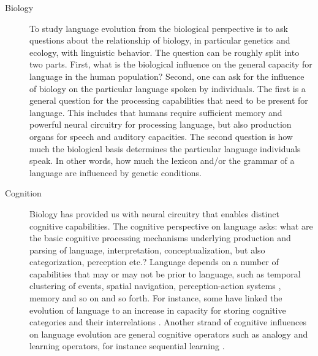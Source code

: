 \begin{description}
\item[Biology] To study language evolution from the biological
perspective is to ask questions about the relationship of biology,
in particular genetics and ecology, with linguistic behavior.
The question can be roughly split into two parts.
First, what is the biological influence on the general capacity for language
in the human population? Second, one can ask for the influence of biology on 
the particular language spoken by individuals. The first is a general question for 
the processing capabilities that need to be present for language.
This includes that humans require sufficient memory and powerful neural 
circuitry for processing language, but also production organs for speech 
and auditory capacities. The second question is how much the biological basis 
determines the particular language individuals speak. 
In other words, how much the lexicon and/or the grammar
of a language are influenced by genetic conditions. 

\item[Cognition] Biology has provided us with neural 
circuitry that enables distinct cognitive capabilities.
The cognitive perspective on language asks: what are the basic cognitive 
processing mechanisms underlying production and parsing of language, 
interpretation, conceptualization, but also categorization, perception
etc.? Language depends on a number of capabilities that may or may 
not be prior to language, such as temporal clustering 
of events, spatial navigation, perception-action systems 
\citep{rizzolatti1998language,arbib2002mirror,steels2012mirror,steels2008mirror},
memory and so on and so forth. For instance, some have linked the evolution 
of language to an increase in capacity for storing cognitive categories and 
their interrelations \citep{schoenemann1999syntax}. Another 
strand of cognitive influences on language evolution are general 
cognitive operators such as analogy and
learning operators, for instance sequential learning 
\citep{christiansen2001sequential}.


\end{description}
